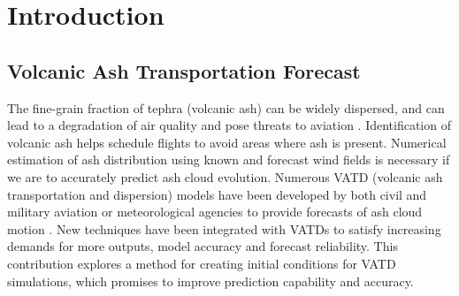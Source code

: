 \documentclass[draft,linenumbers]{agujournal2019}
\begin{document}


%
%

\section{Introduction}

\subsection{Volcanic Ash Transportation Forecast}
The fine-grain fraction of tephra (volcanic ash) can be widely dispersed, and can lead to a degradation of air quality and pose threats to aviation \citep{tupper2007facing}. Identification of volcanic ash helps schedule flights to avoid areas where ash is present. Numerical estimation of ash distribution using known and forecast wind fields is necessary if we are to accurately predict ash cloud evolution. Numerous VATD (volcanic ash transportation and dispersion) models have been developed by both civil and military aviation or meteorological agencies to provide forecasts of ash cloud motion \citep{witham2007comparison}. New techniques have been integrated with VATDs to satisfy increasing demands for more outputs, model accuracy and forecast reliability. This contribution explores a method for creating initial conditions for VATD simulations, which promises to improve prediction capability and accuracy.
\end{document}
